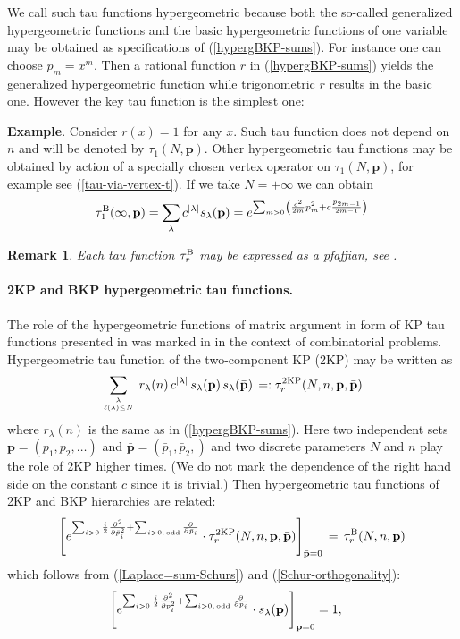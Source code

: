 \documentclass[a4paper,10pt]{article}
\newcommand{\bpow}{\mathbf{p}}
\newcommand{\bbpow}{{\bar{\mathbf{p}}}}
\theoremstyle{plain}
\newtheorem{Remark}{Remark}
\theoremstyle{remark}
\def\be{\begin{equation}}
\def\ee{\end{equation}}
\def\br{\begin{Remark}\rm\small}
\def\er{\end{Remark}}
\begin{document}
We call such tau functions hypergeometric because both the so-called generalized
hypergeometric functions and the basic hypergeometric functions of one variable may be obtained as specifications of
(\ref{hypergBKP-sums}). For instance one can choose $p_m=x^m$. Then a rational function $r$ in (\ref{hypergBKP-sums})
yields the generalized hypergeometric function while trigonometric $r$ results in the basic one. However the key
tau function is the simplest one:

{\bf Example}. Consider $r(x)=1 $ for any $x$. Such tau function does not depend on $n$ and will be denoted
by $\tau_1(N,\bpow)$. Other hypergeometric tau functions may be obtained by action of a specially chosen vertex operator
on $\tau_1(N,\bpow)$, for example see (\ref{tau-via-vertex-t}). If we take $N=+\infty$ we can obtain
\be\label{r=1}
\tau^{\rm B}_1(\infty,\bpow)=\sum_\lambda c^{|\lambda|} s_\lambda(\bpow)=
e^{\sum_{m>0} \left(\frac {c^2}{2m}p_m^2 +c\frac {p_{2m-1}}{2m-1}\right)}
\ee


\br
Each tau function $\tau_r^{\rm B}$ may be expressed as a pfaffian, see \cite{OST-I}.
\er


\paragraph{2KP and BKP hypergeometric tau functions.}
The role of the hypergeometric functions of matrix argument in form of KP tau functions presented in \cite{OS-TMP}
was marked in \cite{Goulden-Jackson-2008} in the context of combinatorial problems.
Hypergeometric tau function of the two-component KP (2KP) may be written as
\be\label{hyperg2KP-sums}
\sum_{\lambda \atop \ell(\lambda)\le N} \, r_\lambda(n)\, c^{|\lambda|}\,s_\lambda(\bpow) \,
s_\lambda(\bbpow) \,
=
: \tau_r^{\rm 2KP}(N,n,\bpow,{\bbpow})
\ee
where $r_\lambda(n)$ is the same as in (\ref{hypergBKP-sums}).
 Here two independent sets $\bpow=(p_1,p_2,\dots)$ and $\bbpow=({\bar p}_1,{\bar p}_2,)$ and
 two discrete parameters $N$ and $n$ play the role of 2KP higher times. (We do not mark the dependence of the right hand
 side on the constant $c$ since it is trivial.)
 Then hypergeometric tau functions of
 2KP and BKP hierarchies are related:
 \be\label{2KP-to-BKP}
\left[ e^{\sum_{i>0}\frac {i}{2}\frac{\partial^2}{\partial {\bar p}_i^2}+
\sum_{i>0,\,{\rm odd}}\frac{\partial}{\partial {\bar p}_i}}\cdot
\tau_r^{\rm 2KP}(N,n,\bpow,{\bbpow})\right]_{\bbpow =0}\,=\,\tau_r^{\rm B}(N,n,\bpow)
 \ee
 which follows from
 (\ref{Laplace=sum-Schurs}) and (\ref{Schur-orthogonality}):
 \be
\left[ e^{\sum_{i>0}\frac {i}{2}\frac{\partial^2}{\partial p_i^2}+
\sum_{i>0,\,{\rm odd}}\frac{\partial}{\partial p_i}}\cdot s_\lambda(\bpow)\right]_{\bpow=0} =1,
\quad
 \ee
\end{document}
